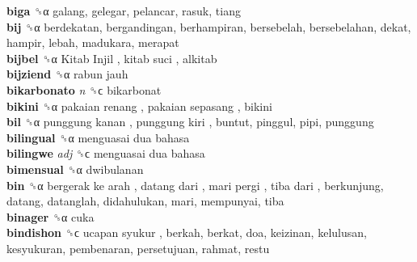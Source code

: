 \textbf{biga} ␝α  galang, gelegar, pelancar, rasuk, tiang  \\
\textbf{bij} ␝α  berdekatan, bergandingan, berhampiran, bersebelah, bersebelahan, dekat, hampir, lebah, madukara, merapat  \\
\textbf{bijbel} ␝α   Kitab Injil ,  kitab suci , alkitab  \\
\textbf{bijziend} ␝α   rabun jauh   \\
\textbf{bikarbonato} \emph{n}  ␝ϲ  bikarbonat  \\
\textbf{bikini} ␝α   pakaian renang ,  pakaian sepasang , bikini  \\
\textbf{bil} ␝α   punggung kanan ,  punggung kiri , buntut, pinggul, pipi, punggung  \\
\textbf{bilingual} ␝α   menguasai dua bahasa   \\
\textbf{bilingwe} \emph{adj}  ␝ϲ   menguasai dua bahasa   \\
\textbf{bimensual} ␝α  dwibulanan  \\
\textbf{bin} ␝α   bergerak ke arah ,  datang dari ,  mari pergi ,  tiba dari , berkunjung, datang, datanglah, didahulukan, mari, mempunyai, tiba  \\
\textbf{binager} ␝α  cuka  \\
\textbf{bindishon} ␝ϲ   ucapan syukur , berkah, berkat, doa, keizinan, kelulusan, kesyukuran, pembenaran, persetujuan, rahmat, restu  \\

